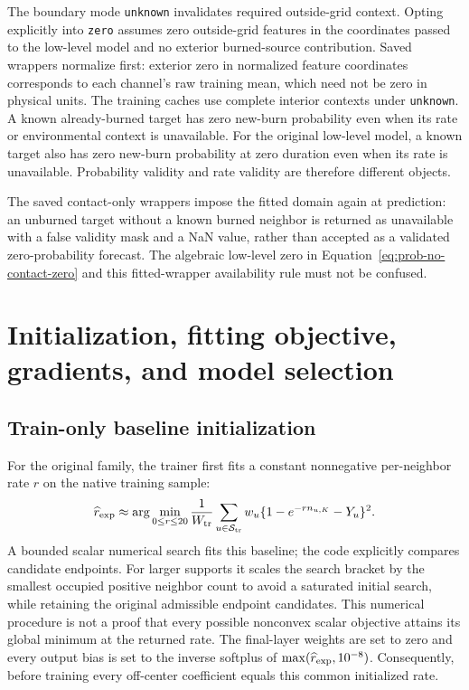 \documentclass[11pt,a4paper]{article}
\begin{document}
The boundary mode \texttt{unknown} invalidates required outside-grid
context. Opting explicitly into \texttt{zero} assumes zero outside-grid
features in the coordinates passed to the low-level model and no exterior
burned-source contribution. Saved wrappers normalize first: exterior zero
in normalized feature coordinates corresponds to each channel's raw training
mean, which need not be zero in physical units. The
training caches use complete interior contexts under \texttt{unknown}.
A known already-burned target has zero new-burn probability even when its
rate or environmental context is unavailable. For the original low-level
model, a known target also has zero new-burn probability at zero duration
even when its rate is unavailable. Probability validity and rate validity
are therefore different objects.

The saved contact-only wrappers impose the fitted domain again at prediction:
an unburned target without a known burned neighbor is returned as unavailable
with a false validity mask and a NaN value, rather than accepted as a
validated zero-probability forecast. The algebraic low-level zero in
Equation~\eqref{eq:prob-no-contact-zero} and this fitted-wrapper availability
rule must not be confused.

\section{Initialization, fitting objective, gradients, and model selection}
\label{sec:probability-fitting}

\subsection{Train-only baseline initialization}

For the original family, the trainer first fits a constant nonnegative
per-neighbor rate $r$ on the native training sample:
\begin{equation}
 \widehat r_{\rm exp}\approx
 \arg\min_{0\leq r\leq20}
 \frac{1}{W_{\mathrm{tr}}}
 \sum_{u\in\mathcal S_{\mathrm{tr}}}w_u
  \{1-e^{-r n_{u,K}}-Y_u\}^{2}.
 \label{eq:prob-rate-init}
\end{equation}
A bounded scalar numerical search fits this baseline; the code explicitly
compares candidate endpoints. For larger supports it scales the search
bracket by the smallest occupied positive neighbor count to avoid a saturated
initial search, while retaining the original admissible endpoint candidates.
This numerical procedure is not a proof that every possible nonconvex scalar
objective attains its global minimum at the returned rate. The final-layer
weights are set to zero and every output bias is set to the inverse softplus
of $\max(\widehat r_{\rm exp},10^{-8})$. Consequently, before training every
off-center coefficient equals this common initialized rate.
\end{document}
